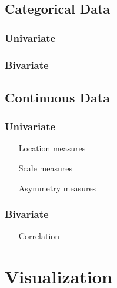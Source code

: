 \documentclass[12pt,a4paper]{report}
\begin{document}
\subsection{Categorical Data}

\subsubsection{Univariate}


\subsubsection{Bivariate}



\subsection{Continuous Data}

\subsubsection{Univariate}

\begin{enumerate}
\item[Location measures]

\item[Scale measures]

\item[Asymmetry measures]

\end{enumerate}


\subsubsection{Bivariate}
\begin{enumerate}
\item[Correlation]
\end{enumerate}










\section{Visualization}
\end{document}
